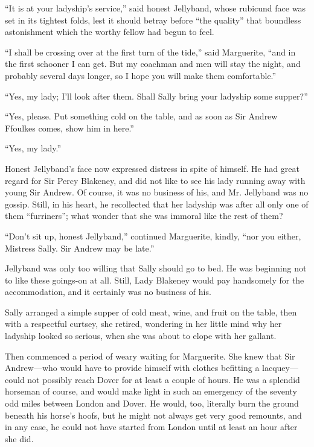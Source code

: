 \documentclass[paper=a5,BCOR=7mm,twoside,DIV=calc,12pt,usegeometry,chapterprefix,endperiod,headings=big]{scrbook}
\begin{document}
\enquote{It is at your ladyship's service,} said honest Jellyband, whose rubicund face was set in its tightest folds, lest it should betray before \enquote{the quality} that boundless astonishment which the worthy fellow had begun to feel.

\enquote{I shall be crossing over at the first turn of the tide,} said Marguerite, \enquote{and in the first schooner I can get. But my coachman and men will stay the night, and probably several days longer, so I hope you will make them comfortable.}

\enquote{Yes, my lady; I'll look after them. Shall Sally bring your ladyship some supper?}

\enquote{Yes, please. Put something cold on the table, and as soon as Sir Andrew Ffoulkes comes, show him in here.}

\enquote{Yes, my lady.}

Honest Jellyband's face now expressed distress in spite of himself. He had great regard for Sir Percy Blakeney, and did not like to see his lady running away with young Sir Andrew. Of course, it was no business of his, and Mr. Jellyband was no gossip. Still, in his heart, he recollected that her ladyship was after all only one of them \enquote{furriners}; what wonder that she was immoral like the rest of them?

\enquote{Don't sit up, honest Jellyband,} continued Marguerite, kindly, \enquote{nor you either, Mistress Sally. Sir Andrew may be late.}

Jellyband was only too willing that Sally should go to bed. He was beginning not to like these goings-on at all. Still, Lady Blakeney would pay handsomely for the accommodation, and it certainly was no business of his.

Sally arranged a simple supper of cold meat, wine, and fruit on the table, then with a respectful curtsey, she retired, wondering in her little mind why her ladyship looked so serious, when she was about to elope with her gallant.

Then commenced a period of weary waiting for Marguerite. She knew that Sir Andrew---who would have to provide himself with clothes befitting a lacquey---could not possibly reach Dover for at least a couple of hours. He was a splendid horseman of course, and would make light in such an emergency of the seventy odd miles between London and Dover. He would, too, literally burn the ground beneath his horse's hoofs, but he might not always get very good remounts, and in any case, he could not have started from London until at least an hour after she did.
\end{document}
